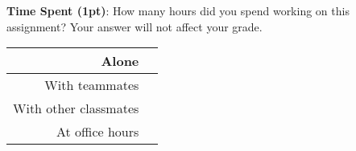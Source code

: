 \documentclass[12pt]{article}
\begin{document}
\noindent\textbf{Time Spent (1pt)}: How many hours did you spend working on this assignment? Your answer will not affect your grade.
\begin{table}[H]
    \centering
    \begin{tabular}{r|c}
        Alone &  \hspace{3em} %
        \\ \hline
        With teammates & \hspace{3em} %
        \\ \hline
        With other classmates & \hspace{3em} %
        \\ \hline
        At office hours & \hspace{3em} %
        \\ \hline
    \end{tabular}
\end{table}
\end{document}

